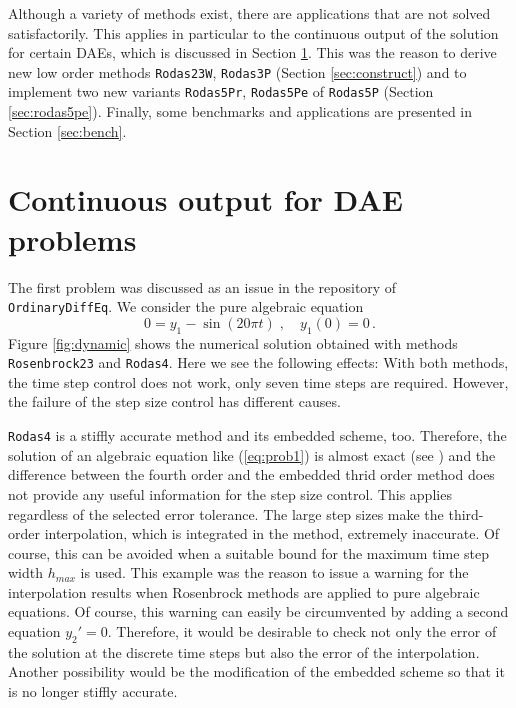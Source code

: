 \documentclass{juliacon}
\begin{document}
Although a variety of methods exist, there are applications that are not solved satisfactorily. This applies in particular to the continuous output of the 
solution for certain DAEs, which is discussed in Section \ref{sec:cont}.
This was the reason to derive new low order methods \verb|Rodas23W|, \verb|Rodas3P| (Section \ref{sec:construct}) and 
to implement two new variants \verb|Rodas5Pr|, \verb|Rodas5Pe| of \verb|Rodas5P| (Section \ref{sec:rodas5pe}).
Finally, some benchmarks and applications are presented in Section \ref{sec:bench}.

\section{Continuous output for DAE problems} \label{sec:cont}

The first problem was discussed as an issue in the repository of\\ \verb|OrdinaryDiffEq|.
We consider the pure algebraic equation
\begin{equation} 0 = y_1 - \sin(20 \pi t) \; , \quad y_1(0)=0 \, .\label{eq:prob1} \end{equation}
Figure \ref{fig:dynamic} shows the numerical solution obtained with methods \verb|Rosenbrock23| and \verb|Rodas4|.
Here we see the following effects: With both methods, the time step control does not work, only seven time steps are required. 
However, the failure of the step size control has different causes. 

\verb|Rodas4| is a stiffly accurate method and its embedded scheme, too. Therefore, the solution of an algebraic equation like (\ref{eq:prob1}) is 
almost exact (see \cite{hairer}) and the difference between the fourth order and the embedded thrid order method does not provide any useful information for the 
step size control.
This applies regardless of the selected error tolerance.
The large step sizes make the third-order interpolation, which is integrated in the method, extremely inaccurate.
Of course, this can be avoided when a suitable bound for the maximum time step width $h_{max}$ is used. 
This example was the reason to issue a warning for the interpolation results when Rosenbrock methods are applied to pure algebraic equations.
Of course, this warning can easily be circumvented by adding a second equation $y_2'=0$. 
Therefore, it would be desirable to check not only the error of the solution at the discrete time steps but also the error of the interpolation.
Another possibility would be the modification of the embedded scheme so that it is no longer stiffly accurate.
\end{document}
